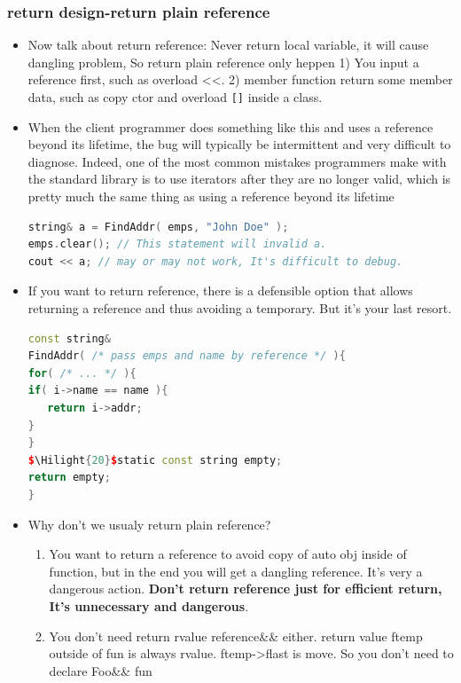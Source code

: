 \documentclass[a4paper,12pt,twoside]{book}
\newcommand{\Hilight}[1]{\makebox[0pt][l]{\color{yellow}\rule[-3pt]{#1em}{11pt}}}
\begin{document}
\subsubsection{return design-return plain reference} 

\begin{itemize}
\item Now talk about return reference: Never return local variable, it will cause dangling problem, So return plain reference only heppen 1) You input a reference first, such as overload <<. 2) member function return some member data, such as copy ctor and overload \verb=[]= inside a class.

\item  When the client programmer does something like this and uses a reference beyond its lifetime, the bug will typically be intermittent and very difficult to diagnose. Indeed, one of the most common mistakes programmers make with the standard library is to use iterators after they are no longer valid, which is pretty much the same thing as using a reference beyond its lifetime

\begin{lstlisting}[frame=single, language=c++, mathescape=true]
string& a = FindAddr( emps, "John Doe" );
emps.clear(); // This statement will invalid a.
cout << a; // may or may not work, It's difficult to debug.
\end{lstlisting}

\item If you want to return reference,  there is a defensible option that allows returning a reference and thus avoiding a temporary. But it's your last resort.
\begin{lstlisting}[frame=single, language=c++, mathescape=true]
const string&
FindAddr( /* pass emps and name by reference */ ){
for( /* ... */ ){
if( i->name == name ){
   return i->addr;
}
}
$\Hilight{20}$static const string empty;
return empty;
}
\end{lstlisting}

\item Why don't we usualy return plain reference?
\begin{enumerate}
\item You want to return a reference to avoid copy of auto obj inside of function,  but in the end you will get a dangling reference. It's very a dangerous action. \textbf{Don't return reference just for efficient return, It's unnecessary and dangerous}.

\item You don't need return rvalue reference\&\& either.  return value ftemp outside of fun is always rvalue. ftemp->flast is move.  So you don't need to declare Foo\&\& fun


\end{enumerate}
\end{itemize}
\end{document}
